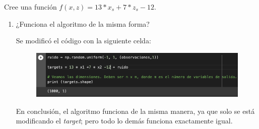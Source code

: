 \begin{problema}
	Cree una función $f(x,z) = 13 * x_s + 7 * z_s  - 12$. 
	\begin{enumerate}
		\item ¿Funciona el algoritmo de la misma forma?
		\begin{sol}
			Se modificó el código con la siguiente celda:
				\begin{figure}[H]
				\centering
				\includegraphics[scale=0.5]{Images/3}
			\end{figure}
		En conclusión, el algoritmo funciona de la misma manera, ya que solo se está modificando el \textit{target}; pero todo lo demás funciona exactamente igual. 
		\end{sol}
	\end{enumerate}
	
\end{problema}




